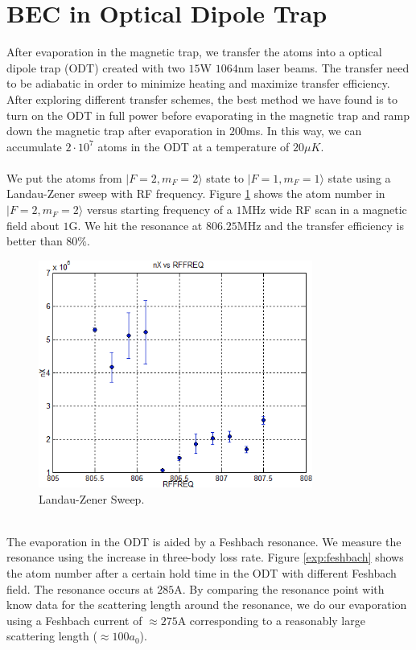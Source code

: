 \section{BEC in Optical Dipole Trap}\label{exp:odt}

After evaporation in the magnetic trap, we transfer the atoms into a optical dipole trap (ODT) created with two $15$W $1064$nm laser beams. The transfer need to be adiabatic in order to minimize heating and maximize transfer efficiency. After exploring different transfer schemes, the best method we have found is to turn on the ODT in full power before evaporating in the magnetic trap and ramp down the magnetic trap after evaporation in $200$ms. In this way, we can accumulate $2\cdot10^7$ atoms in the ODT at a temperature of $20\mu K$.\\
\\
We put the atoms from $|F=2, m_F=2\rangle$ state to $|F=1, m_F=1\rangle$ state using a Landau-Zener sweep with RF frequency. Figure \ref{exp:landao-zener} shows the atom number in $|F=2, m_F=2\rangle$ versus starting frequency of a $1$MHz wide RF scan in a magnetic field about $1$G. We hit the resonance at $806.25$MHz and the transfer efficiency is better than $80\%$.\\
\begin{figure}
  \begin{center}
    \includegraphics[width=9cm]{landao-zener.png}
  \end{center}
  \caption{Landau-Zener Sweep.}
  \label{exp:landao-zener}
\end{figure}\\
The evaporation in the ODT is aided by a Feshbach resonance. We measure the resonance using the increase in three-body loss rate. Figure \ref{exp:feshbach} shows the atom number after a certain hold time in the ODT with different Feshbach field. The resonance occurs at $285$A. By comparing the resonance point with know data for the scattering length around the resonance, we do our evaporation using a Feshbach current of $\approx275$A corresponding to a reasonably large scattering length ($\approx100a_0$).
